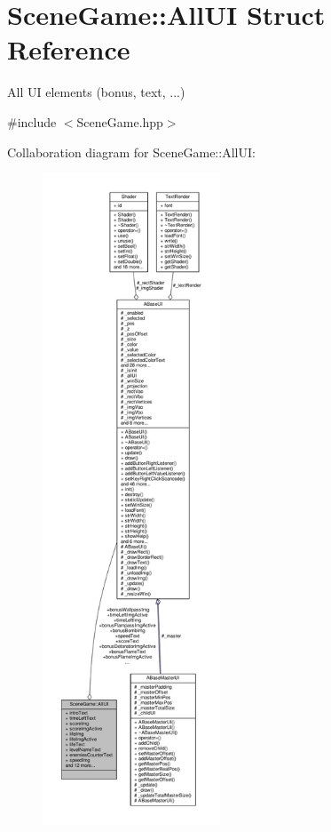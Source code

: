 \hypertarget{struct_scene_game_1_1_all_u_i}{}\section{Scene\+Game\+:\+:All\+UI Struct Reference}
\label{struct_scene_game_1_1_all_u_i}


All UI elements (bonus, text, ...)  




{\ttfamily \#include $<$Scene\+Game.\+hpp$>$}



Collaboration diagram for Scene\+Game\+:\+:All\+UI\+:
\nopagebreak
\begin{figure}[H]
\begin{center}
\leavevmode
\includegraphics[height=550pt]{struct_scene_game_1_1_all_u_i__coll__graph}
\end{center}
\end{figure}
